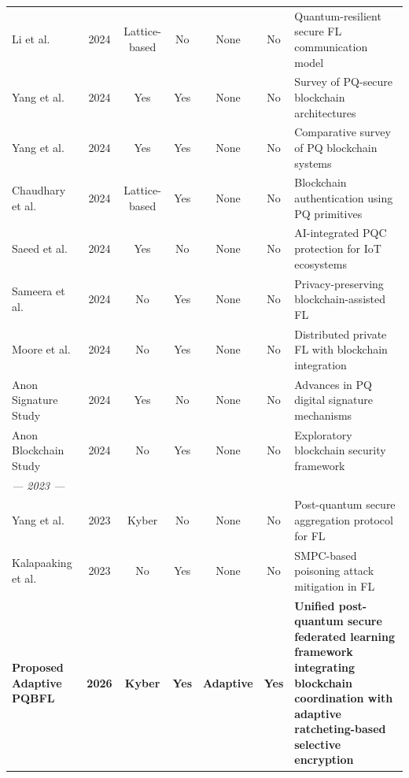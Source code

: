 \documentclass[journal, 10pt, twocolumn]{IEEEtran}
\begin{document}
\begin{table}[htbp]
\begin{tabularx}{\textwidth}{l c c c c c X}
Li et al. \cite{li2024}
& 2024 & Lattice-based & No & None & No
& Quantum-resilient secure FL communication model \\

Yang et al. \cite{yang2024_survey1}
& 2024 & Yes & Yes & None & No
& Survey of PQ-secure blockchain architectures \\

Yang et al. \cite{yang2024_survey2}
& 2024 & Yes & Yes & None & No
& Comparative survey of PQ blockchain systems \\

Chaudhary et al. \cite{chaudhary2024}
& 2024 & Lattice-based & Yes & None & No
& Blockchain authentication using PQ primitives \\

Saeed et al. \cite{saeed2024}
& 2024 & Yes & No & None & No
& AI-integrated PQC protection for IoT ecosystems \\

Sameera et al. \cite{sameera2024}
& 2024 & No & Yes & None & No
& Privacy-preserving blockchain-assisted FL \\

Moore et al. \cite{moore2024}
& 2024 & No & Yes & None & No
& Distributed private FL with blockchain integration \\

Anon Signature Study \cite{anon_pdf1}
& 2024 & Yes & No & None & No
& Advances in PQ digital signature mechanisms \\

Anon Blockchain Study \cite{anon_crdownload}
& 2024 & No & Yes & None & No
& Exploratory blockchain security framework \\

\multicolumn{7}{l}{\textit{--- 2023 ---}} \\

Yang et al. \cite{yang2023_secureagg}
& 2023 & Kyber & No & None & No
& Post-quantum secure aggregation protocol for FL \\

Kalapaaking et al. \cite{kalapaaking2023}
& 2023 & No & Yes & None & No
& SMPC-based poisoning attack mitigation in FL \\

\midrule

\textbf{Proposed Adaptive PQBFL}
& \textbf{2026}
& \textbf{Kyber}
& \textbf{Yes}
& \textbf{Adaptive}
& \textbf{Yes}
& \textbf{Unified post-quantum secure federated learning framework integrating blockchain coordination with adaptive ratcheting-based selective encryption}

\\
\bottomrule
\end{tabularx}
\end{table}
\end{document}
